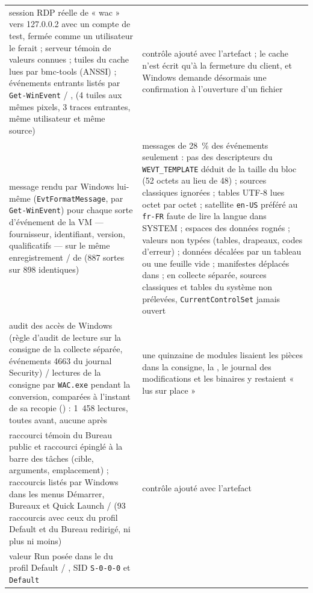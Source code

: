 \documentclass[11pt,a4paper,oneside]{report}
\begin{document}
\begin{longtable}{@{}L{6.6cm}L{8.4cm}@{}}
session RDP réelle de « wac » vers 127.0.0.2 avec un compte de test, fermée
  comme un utilisateur le ferait ; serveur témoin de valeurs connues ; tuiles du
  cache lues par bmc-tools (ANSSI) ; événements entrants listés par
  \texttt{Get-WinEvent} / , 
  (4 tuiles aux mêmes pixels, 3 traces entrantes, même utilisateur et même
  source) &
  contrôle ajouté avec l'artefact ; le cache n'est écrit qu'à la fermeture du
  client, et Windows demande désormais une confirmation à l'ouverture d'un
  fichier  \\
message rendu par Windows lui-même (\texttt{EvtFormatMessage}, par
  \texttt{Get-WinEvent}) pour chaque sorte d'événement de la VM — fournisseur,
  identifiant, version, qualificatifs — sur le même enregistrement /
   de  (887 sortes sur 898
  identiques) &
  messages de 28~\% des événements seulement : pas des descripteurs du
  \texttt{WEVT\_TEMPLATE} déduit de la taille du bloc (52 octets au lieu de
  48) ; sources classiques ignorées ; tables UTF-8 lues octet par octet ;
  satellite \texttt{en-US} préféré au \texttt{fr-FR} faute de lire la langue
  dans SYSTEM ; espaces des données rognés ; valeurs non typées (tables,
  drapeaux, codes d'erreur) ; données décalées par un tableau ou une feuille
  vide ; manifestes déplacés dans  ; en collecte
  séparée, sources classiques et tables du système non prélevées,
  \texttt{CurrentControlSet} jamais ouvert \\
audit des accès de Windows (règle d'audit de lecture sur la consigne de la
  collecte séparée, événements 4663 du journal Security) / lectures de la
  consigne par \texttt{WAC.exe} pendant la conversion, comparées à l'instant
  de sa recopie () : 1~458 lectures, toutes avant,
  aucune après &
  une quinzaine de modules lisaient les pièces dans la consigne, la
  , le journal des modifications et les binaires y restaient
  « lus sur place » \\
raccourci témoin du Bureau public et raccourci épinglé à la barre des tâches
  (cible, arguments, emplacement) ; raccourcis listés par Windows dans les
  menus Démarrer, Bureaux et Quick Launch / 
  (93 raccourcis avec ceux du profil Default et du Bureau redirigé, ni plus ni moins) &
  contrôle ajouté avec l'artefact \\
valeur Run posée dans le  du profil Default /
  , SID \texttt{S-0-0-0} et  \texttt{Default} &

\end{longtable}
\end{document}
